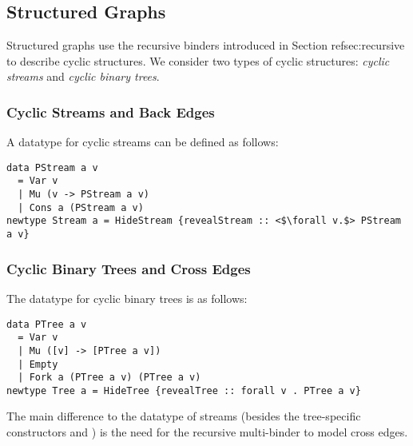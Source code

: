\subsection{Structured Graphs}\label{subsec:graphs}

Structured graphs use the recursive binders introduced in Section ref{sec:recursive} to describe cyclic structures. We consider two types of cyclic structures: \emph{cyclic streams} and \emph{cyclic binary trees}.

\subsubsection{Cyclic Streams and Back Edges}
\label{subsubsec:streams}

A datatype for cyclic streams can be defined as follows:

\vspace{1mm}
\begin{verbatim}
data PStream a v
  = Var v
  | Mu (v -> PStream a v)
  | Cons a (PStream a v)
newtype Stream a = HideStream {revealStream :: <$\forall v.$> PStream a v}
\end{verbatim}
\vspace{1mm}

\subsubsection{Cyclic Binary Trees and Cross Edges}
\label{subsubsec:trees}

The datatype for cyclic binary trees is as follows:

\vspace{1mm}
\begin{verbatim}
data PTree a v
  = Var v
  | Mu ([v] -> [PTree a v])
  | Empty
  | Fork a (PTree a v) (PTree a v)
newtype Tree a = HideTree {revealTree :: forall v . PTree a v}
\end{verbatim}
\vspace{1mm}

The main difference to the datatype of streams (besides the tree-specific constructors  and ) is the need for the recursive multi-binder to model cross edges.
